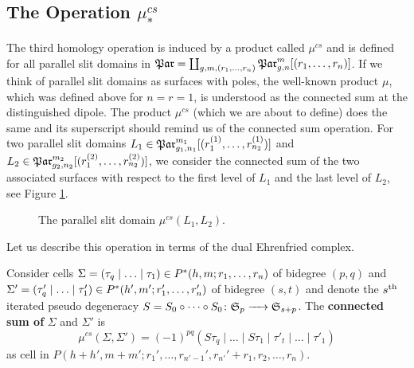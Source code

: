 \subsection{The Operation \texorpdfstring{$\mu^{cs}_\ast$}{muconnected_sum*}}
\label{homology_operations:parallel_patching_slit_pics:construction_of_mu_cs}
The third homology operation is induced by a product called $\mu^{cs}$
\label{page:shorthand_par}%
and is defined for all parallel slit domains in $\Par = \coprod_{g,m,(r_1,\ldots, r_n)}\Parr$.
If we think of parallel slit domains as surfaces with poles, the well-known product $\mu$, which was defined above for $n=r=1$,
is understood as the connected sum at the distinguished dipole.
The product $\mu^{cs}$ (which we are about to define) does the same and its superscript should remind us of the connected sum operation.
For two parallel slit domains $L_1 \in \Par_{g_1,n_1}^{m_1}[(r^{(1)}_1, \ldots, r^{(1)}_{n_2})]$ and $L_2 \in \Par_{g_2,n_2}^{m_2}[(r^{(2)}_1, \ldots, r^{(2)}_{n_2})]$,
we consider the connected sum of the two associated surfaces with respect to the first level of $L_1$ and the last level of $L_2$, see Figure \ref{homology_operations:parallel_patching_slit_pics:mu_cs}.
\begin{figure}[ht]
    \centering
    \def\svgwidth{.3\columnwidth}
    
    \caption{\label{homology_operations:parallel_patching_slit_pics:mu_cs}The parallel slit domain $\mu^{cs}(L_1, L_2)$.}
\end{figure}

Let us describe this operation in terms of the dual Ehrenfried complex.
\begin{defi}
    \label{homology_operations:parallel_patching_slit_pics:connected_sum}
    Consider cells $\Sigma = \inhomq[\tau] \in P^\ast(h,m; r_1, \ldots, r_n)$ of bidegree $(p,q)$ and $\Sigma' = \inhomq[\tau'] \in P^\ast(h',m';r'_1, \ldots, r'_n)$ of bidegree $(s, t)$
    and denote the $s^{\text{th}}$ iterated pseudo degeneracy $S = S_0 \circ \cdots \circ S_0 \colon \mathfrak S_{p} \xrightarrow{\hspace{6pt}{}\hspace{6pt}} \mathfrak S_{s+p}$.
    The {\bf connected sum of} $\Sigma$ and $\Sigma'$ is
    \[
        \mu^{cs}(\Sigma, \Sigma') = (-1)^{pq} (S\tau_q \mid \ldots \mid S\tau_1 \mid \tau'_t \mid \ldots \mid \tau'_1)
    \]
    as cell in $P(h+h',m+m'; r_1', \ldots, r_{n'-1}', r_{n'}' + r_1, r_2, \ldots, r_n)$.
\end{defi}

